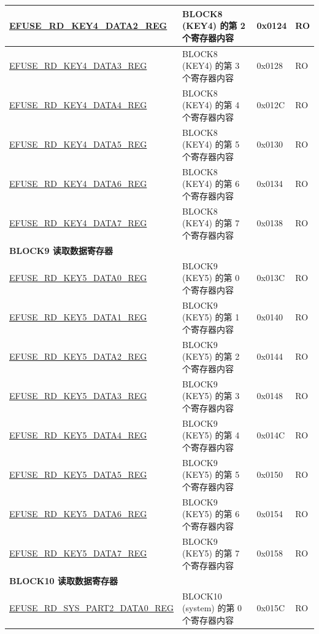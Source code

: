 \begin{longtable}{ | p{7cm} | p{7.2cm} | p{1.3cm} | p{1cm} | }
\hyperref[regdesc:EFUSERDKEY4DATANREG]{EFUSE\_RD\_KEY4\_DATA2\_REG} & BLOCK8 (KEY4) 的第 2 个寄存器内容 & 0x0124 & RO \\ \hline
\hyperref[regdesc:EFUSERDKEY4DATANREG]{EFUSE\_RD\_KEY4\_DATA3\_REG} & BLOCK8 (KEY4) 的第 3 个寄存器内容 & 0x0128 & RO \\ \hline
\hyperref[regdesc:EFUSERDKEY4DATANREG]{EFUSE\_RD\_KEY4\_DATA4\_REG} & BLOCK8 (KEY4) 的第 4 个寄存器内容 & 0x012C & RO \\ \hline
\hyperref[regdesc:EFUSERDKEY4DATANREG]{EFUSE\_RD\_KEY4\_DATA5\_REG} & BLOCK8 (KEY4) 的第 5 个寄存器内容 & 0x0130 & RO \\ \hline
\hyperref[regdesc:EFUSERDKEY4DATANREG]{EFUSE\_RD\_KEY4\_DATA6\_REG} & BLOCK8 (KEY4) 的第 6 个寄存器内容 & 0x0134 & RO \\ \hline
\hyperref[regdesc:EFUSERDKEY4DATANREG]{EFUSE\_RD\_KEY4\_DATA7\_REG} & BLOCK8 (KEY4) 的第 7 个寄存器内容 & 0x0138 & RO \\ \hline
\multicolumn{4}{|l|}{\textbf{BLOCK9 读取数据寄存器}} \\ \hline
\hyperref[regdesc:EFUSERDKEY5DATANREG]{EFUSE\_RD\_KEY5\_DATA0\_REG} & BLOCK9 (KEY5) 的第 0 个寄存器内容 & 0x013C & RO \\ \hline
\hyperref[regdesc:EFUSERDKEY5DATANREG]{EFUSE\_RD\_KEY5\_DATA1\_REG} & BLOCK9 (KEY5) 的第 1 个寄存器内容 & 0x0140 & RO \\ \hline
\hyperref[regdesc:EFUSERDKEY5DATANREG]{EFUSE\_RD\_KEY5\_DATA2\_REG} & BLOCK9 (KEY5) 的第 2 个寄存器内容 & 0x0144 & RO \\ \hline
\hyperref[regdesc:EFUSERDKEY5DATANREG]{EFUSE\_RD\_KEY5\_DATA3\_REG} & BLOCK9 (KEY5) 的第 3 个寄存器内容 & 0x0148 & RO \\ \hline
\hyperref[regdesc:EFUSERDKEY5DATANREG]{EFUSE\_RD\_KEY5\_DATA4\_REG} & BLOCK9 (KEY5) 的第 4 个寄存器内容 & 0x014C & RO \\ \hline
\hyperref[regdesc:EFUSERDKEY5DATANREG]{EFUSE\_RD\_KEY5\_DATA5\_REG} & BLOCK9 (KEY5) 的第 5 个寄存器内容 & 0x0150 & RO \\ \hline
\hyperref[regdesc:EFUSERDKEY5DATANREG]{EFUSE\_RD\_KEY5\_DATA6\_REG} & BLOCK9 (KEY5) 的第 6 个寄存器内容 & 0x0154 & RO \\ \hline
\hyperref[regdesc:EFUSERDKEY5DATANREG]{EFUSE\_RD\_KEY5\_DATA7\_REG} & BLOCK9 (KEY5) 的第 7 个寄存器内容 & 0x0158 & RO \\ \hline
\multicolumn{4}{|l|}{\textbf{BLOCK10 读取数据寄存器}} \\ \hline
\hyperref[regdesc:EFUSERDSYSPART2DATANREG]{EFUSE\_RD\_SYS\_PART2\_DATA0\_REG} & BLOCK10 (system) 的第 0 个寄存器内容 & 0x015C & RO \\ \hline

\end{longtable}
